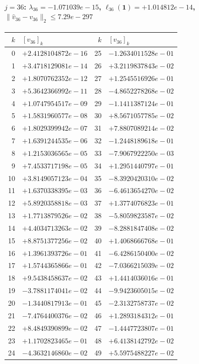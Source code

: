 \paragraph{$j = 36$: $\lambda_{36} = -1.071039e-15$, \quad $\ell_{36}(\mathbf{1}) = +1.014812e-14$, \quad $\|\hat{v}_{36} - v_{36}\|_2 \leq 7.29e-297$}
\begin{center}
{\footnotesize
\begin{tabular}{r@{\;\;}l@{\quad}r@{\;\;}l}
\toprule
$k$ & $[v_{36}]_k$ & $k$ & $[v_{36}]_k$ \\
\midrule
0 & $+2.4128104872e-16$ & 25 & $-1.2634011528e-01$ \\
1 & $+3.4718129081e-14$ & 26 & $+3.2119837843e-02$ \\
2 & $+1.8070762352e-12$ & 27 & $+1.2545516926e-01$ \\
3 & $+5.3642366992e-11$ & 28 & $-4.8652278268e-02$ \\
4 & $+1.0747954517e-09$ & 29 & $-1.1411387124e-01$ \\
5 & $+1.5831960577e-08$ & 30 & $+8.5671057785e-02$ \\
6 & $+1.8029399942e-07$ & 31 & $+7.8807089214e-02$ \\
7 & $+1.6391244535e-06$ & 32 & $-1.2448189618e-01$ \\
8 & $+1.2153036565e-05$ & 33 & $-7.9067922250e-03$ \\
9 & $+7.4533717198e-05$ & 34 & $+1.2951440797e-01$ \\
10 & $+3.8149057123e-04$ & 35 & $-8.3920420310e-02$ \\
11 & $+1.6370338395e-03$ & 36 & $-6.4613654270e-02$ \\
12 & $+5.8920358818e-03$ & 37 & $+1.3774076823e-01$ \\
13 & $+1.7713879526e-02$ & 38 & $-5.8059823587e-02$ \\
14 & $+4.4034713263e-02$ & 39 & $-8.2881847408e-02$ \\
15 & $+8.8751377256e-02$ & 40 & $+1.4068666768e-01$ \\
16 & $+1.3961393726e-01$ & 41 & $-6.4286150400e-02$ \\
17 & $+1.5744365866e-01$ & 42 & $-7.0366215039e-02$ \\
18 & $+9.5438458637e-02$ & 43 & $+1.4414036016e-01$ \\
19 & $-3.7881174041e-02$ & 44 & $-9.9423605015e-02$ \\
20 & $-1.3440817913e-01$ & 45 & $-2.3132758737e-02$ \\
21 & $-7.4764400376e-02$ & 46 & $+1.2893184312e-01$ \\
22 & $+8.4849390899e-02$ & 47 & $-1.4447723807e-01$ \\
23 & $+1.1702823465e-01$ & 48 & $+6.4138142792e-02$ \\
24 & $-4.3632146860e-02$ & 49 & $+5.5975488227e-02$ \\
\bottomrule
\end{tabular}
}
\end{center}

